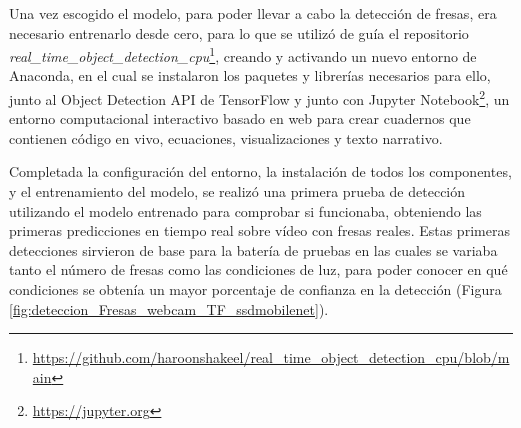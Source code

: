 Una vez escogido el modelo, para poder llevar a cabo la detección de fresas, era necesario entrenarlo desde cero, para lo que se utilizó de guía el repositorio \textit{real\_time\_object\_detection\_cpu}\footnote{\url{https://github.com/haroonshakeel/real_time_object_detection_cpu/blob/main}}, creando y activando un nuevo entorno de Anaconda, en el cual se instalaron los paquetes y librerías necesarios para ello, junto al Object Detection API de TensorFlow y junto con Jupyter Notebook\footnote{\url{https://jupyter.org}}, un entorno computacional interactivo basado en web para crear cuadernos que contienen código en vivo, ecuaciones, visualizaciones y texto narrativo. 

\pagebreak
Completada la configuración del entorno, la instalación de todos los componentes, y el entrenamiento del modelo, se realizó una primera prueba de detección utilizando el modelo entrenado para comprobar si funcionaba, obteniendo las primeras predicciones en tiempo real sobre vídeo con fresas reales. Estas primeras detecciones sirvieron de base para la batería de pruebas en las cuales se variaba tanto el número de fresas como las condiciones de luz, para poder conocer en qué condiciones se obtenía un mayor porcentaje de confianza en la detección (Figura \ref{fig:deteccion_Fresas_webcam_TF_ssdmobilenet}).

